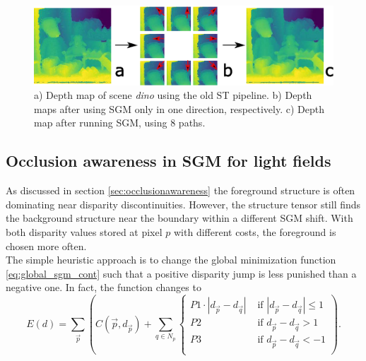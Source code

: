 \documentclass  [
  paper    = a4,
  BCOR     = 10mm,
  twoside,
  fontsize = 12pt,
  fleqn,
  toc      = bibnumbered,
  toc      = listofnumbered,
  numbers  = noendperiod,
  headings = normal,
  listof   = leveldown,
  version  = 3.03
]                                       {scrreprt}
\begin{document}
\begin{figure}[h!]
	\centering
	\includegraphics[width=1\linewidth]{images/subplot_sgm}
	\caption[SGM depth map from different directions]{a) Depth map of scene \textit{dino} using the old ST pipeline. b) Depth maps after using SGM only in one direction, respectively. c) Depth map after running SGM, using 8 paths.}
	\label{fig:subplotsgm}
\end{figure}

\subsection{Occlusion awareness in SGM for light fields}
\label{sec:semiglobal3}
As discussed in section \ref{sec:occlusionawareness} the foreground structure is often dominating near disparity discontinuities. However, the structure tensor still finds the background structure near the boundary within a different SGM shift. With both disparity values stored at pixel $p$ with different costs, the foreground is chosen more often.\\
The simple heuristic approach is to change the global minimization function \ref{eq:global_sgm_cont} such that a positive disparity jump is less punished than a negative one. In fact, the function changes to
\begin{equation}\label{eq:global_sgm_cont_occlusion}
E(d) = \sum_{\vec p} \left(C(\vec{p}, d_{\vec p}) + \sum_{q\in N_p} 
\begin{cases}
P1\cdot |d_{\vec p} - d_{\vec q}|  & \text{ if }|d_{\vec p} - d_{\vec q}| \leq 1\\
P2 & \text{ if }d_{\vec p} - d_{\vec q} > 1\\
P3 & \text{ if }d_{\vec p} - d_{\vec q} < -1\\
\end{cases}  
\right).
\end{equation}
\end{document}
